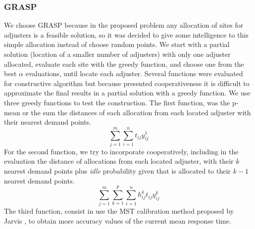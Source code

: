 \subsubsection{GRASP}
We choose GRASP
because
in the proposed problem
any allocation of sites for adjusters
is a feasible solution,
so it was decided to give some intelligence
to this simple allocation
instead of choose
random points.
We start with a partial solution
(location of a smaller number of adjusters)
with only one adjuster allocated,
evaluate each site with the greedy function,
and choose one from the best $\alpha$ evaluations,
until locate each adjuster.
Several functions were evaluated
for constructive algorithm
but because presented cooperativeness
it is difficult
to approximate the final results
in a partial solution
with a greedy function.
We use three greedy functions
to test the construction.
The first function,
was the p-mean
or the sum the distances
of each allocation 
from each located adjuster
with their nearest demand points.
\begin{equation}
  \label{eq:grasp1}
  \sum_{j=1}^{m}{
    \sum_{i=1}^{n}{
      t_{ij}y_{ij}^{1}
    }
  }
\end{equation}
For the second function,
we try to incorporate cooperatively,
including in the evaluation
the distance of allocations
from each located adjuster,
with their $k$ nearest demand points
plus \textit{idle} probability
given that is allocated
to their $k-1$ nearest demand points.
\begin{equation}
  \label{eq:grasp2}
  \sum_{j=1}^{m}{
    \sum_{k=1}^{p}{
      \sum_{i=1}^{n}{
        h_{ij}^{k}t_{ij}y_{ij}^{k}
      }
    }
  }
\end{equation}
The third function,
consist in use the MST calibration method
proposed by Jarvis \cite{jarvis1985approximating},
to obtain more accuracy values
of the current mean response time.

